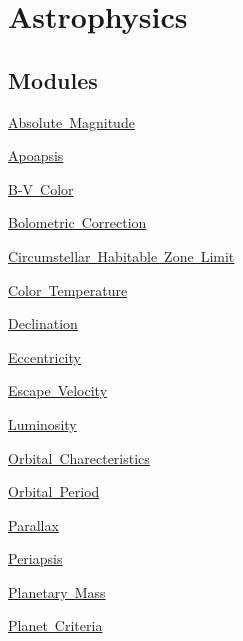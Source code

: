 \hypertarget{group___e_g_x_phys-_astrophysics}{}\section{Astrophysics}
\label{group___e_g_x_phys-_astrophysics}
\subsection*{Modules}
\begin{DoxyCompactItemize}
\item 
\mbox{\hyperlink{group___e_g_x_phys-_astrophysics-_absolute_magnitude}{Absolute Magnitude}}
\item 
\mbox{\hyperlink{group___e_g_x_phys-_apoapsis}{Apoapsis}}
\item 
\mbox{\hyperlink{group___e_g_x_phys-_astrophysic-_b-_v_color}{B-\/\+V Color}}
\item 
\mbox{\hyperlink{group___e_g_x_phys-_astrophysic-_bolometric_correction}{Bolometric Correction}}
\item 
\mbox{\hyperlink{group___e_g_x_phys-_circumstellar_habitable_zone_limit}{Circumstellar Habitable Zone Limit}}
\item 
\mbox{\hyperlink{group___e_g_x_phys-_astrophysics-_color_temperature}{Color Temperature}}
\item 
\mbox{\hyperlink{group___e_g_x_phys-_astrophysics-_declination}{Declination}}
\item 
\mbox{\hyperlink{group___e_g_x_phys-_eccentricity}{Eccentricity}}
\item 
\mbox{\hyperlink{group___e_g_x_phys-_astrophysics-_escape_velocity}{Escape Velocity}}
\item 
\mbox{\hyperlink{group___e_g_x_phys-_luminosity}{Luminosity}}
\item 
\mbox{\hyperlink{group___e_g_x_phys-_orbital_charecteristics}{Orbital Charecteristics}}
\item 
\mbox{\hyperlink{group___e_g_x_phys-_astrophysic-_orbital_period}{Orbital Period}}
\item 
\mbox{\hyperlink{group___e_g_x_phys-_astrophysic-_parallax}{Parallax}}
\item 
\mbox{\hyperlink{group___e_g_x_phys-_periapsis}{Periapsis}}
\item 
\mbox{\hyperlink{group___e_g_x_phys-_planetary_mass}{Planetary Mass}}
\item 
\mbox{\hyperlink{group___e_g_x_phys-_planet_criteria}{Planet Criteria}}
\item 

\end{DoxyCompactItemize}
